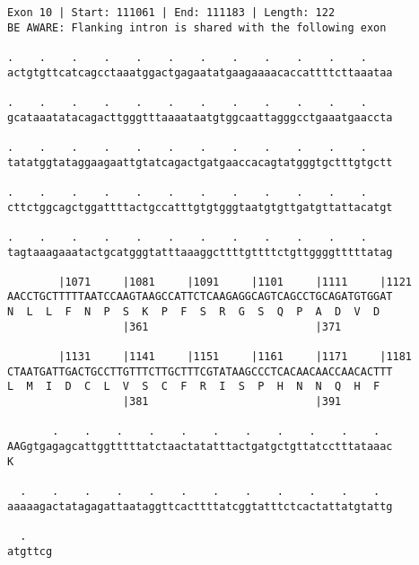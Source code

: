 \documentclass{article}
\begin{document}
\newpage
\begin{Verbatim}
Exon 10 | Start: 111061 | End: 111183 | Length: 122
BE AWARE: Flanking intron is shared with the following exon
 
.    .    .    .    .    .    .    .    .    .    .    .    
actgtgttcatcagcctaaatggactgagaatatgaagaaaacaccattttcttaaataa
  
.    .    .    .    .    .    .    .    .    .    .    .    
gcataaatatacagacttgggtttaaaataatgtggcaattagggcctgaaatgaaccta
  
.    .    .    .    .    .    .    .    .    .    .    .    
tatatggtataggaagaattgtatcagactgatgaaccacagtatgggtgctttgtgctt
  
.    .    .    .    .    .    .    .    .    .    .    .    
cttctggcagctggattttactgccatttgtgtgggtaatgtgttgatgttattacatgt
  
.    .    .    .    .    .    .    .    .    .    .    .    
tagtaaagaaatactgcatgggtatttaaaggcttttgttttctgttggggtttttatag
  
        |1071     |1081     |1091     |1101     |1111     |1121
AACCTGCTTTTTAATCCAAGTAAGCCATTCTCAAGAGGCAGTCAGCCTGCAGATGTGGAT
N  L  L  F  N  P  S  K  P  F  S  R  G  S  Q  P  A  D  V  D  
                  |361                          |371        
  
        |1131     |1141     |1151     |1161     |1171     |1181
CTAATGATTGACTGCCTTGTTTCTTGCTTTCGTATAAGCCCTCACAACAACCAACACTTT
L  M  I  D  C  L  V  S  C  F  R  I  S  P  H  N  N  Q  H  F  
                  |381                          |391        
  
       .    .    .    .    .    .    .    .    .    .    .  
AAGgtgagagcattggtttttatctaactatatttactgatgctgttatcctttataaac
K                                                           
  
  .    .    .    .    .    .    .    .    .    .    .    .  
aaaaagactatagagattaataggttcacttttatcggtatttctcactattatgtattg
  
  .    
atgttcg
\end{Verbatim}
\newpage
\end{document}
